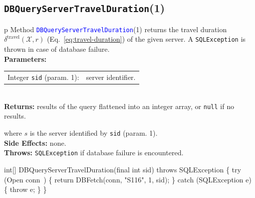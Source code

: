 \subsection{{\tt{}\protect{}DBQueryServerTravelDuration}(1)}
\begin{tabular}{p{\textwidth}}
\toprule
{}
Method \textcolor{blue}{{\tt{}\protect{}DBQueryServerTravelDuration}}(1) returns the
travel duration $\delta^\textrm{travel}(\mathcal{X},r)$
(Eq.~\ref{eq:travel-duration}) of the given server.
A {\tt{}SQLException} is thrown in case of database failure.\\
\midrule
\textbf{Parameters:}\\
\begin{tabular}{lp{116mm}}
Integer {\tt{}sid} (param. 1):&server identifier.
\end{tabular}\\
\textbf{Returns:} results of the query flattened into an integer array,
or {\tt{}null} if no results.


where $s$ is the server identified by {\tt{}sid} (param. 1).\\
\textbf{Side Effects:} none.\\
\textbf{Throws:} {\tt{}SQLException} if database failure is encountered.\\
\bottomrule
\end{tabular}
\nwenddocs{}\endmoddef{}
int[] DBQueryServerTravelDuration(final int sid) throws SQLException \{
  try (\LA{}Open \code{}conn\edoc{}~{\nwtagstyle{}}\RA{}) \{
    return DBFetch(conn, "S116", 1, sid);
  \} catch (SQLException e) \{
    throw e;
  \}
\}
\eatline
{}\nwendcode{}\nwdocspar
